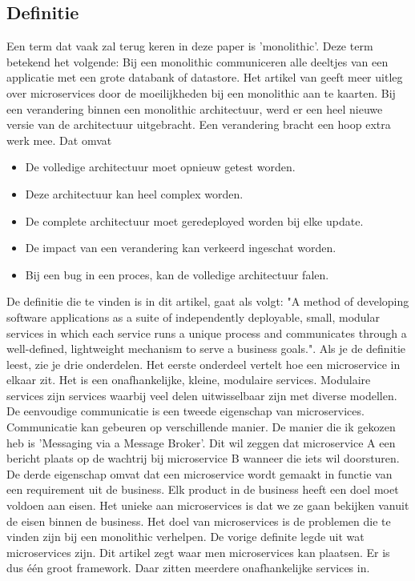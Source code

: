 \subsection{Definitie}
Een term dat vaak zal terug keren in deze paper is 'monolithic'. Deze term betekend het volgende: Bij een monolithic communiceren alle deeltjes van een applicatie met een grote databank of datastore.
Het artikel van \textcite{Mauersberger2017} geeft meer uitleg over microservices door de moeilijkheden bij een monolithic aan te kaarten. Bij een verandering binnen een monolithic architectuur, werd er een heel nieuwe versie van de architectuur uitgebracht. Een verandering bracht een hoop extra werk mee. Dat omvat 
\begin{itemize}
	\item De volledige architectuur moet opnieuw getest worden.
	\item Deze architectuur kan heel complex worden.
	\item De complete architectuur moet geredeployed worden bij elke update.
	\item De impact van een verandering kan verkeerd ingeschat worden.
	\item Bij een bug in een proces, kan de volledige architectuur falen.
\end{itemize}
De definitie die te vinden is in dit artikel, gaat als volgt: "A method of developing software applications as a suite of independently deployable, small, modular services in which each service runs a unique process and communicates through a well-defined, lightweight mechanism to serve a business goals.". Als je de definitie leest, zie je drie onderdelen. Het eerste onderdeel vertelt hoe een microservice in elkaar zit. Het is een onafhankelijke, kleine, modulaire services. Modulaire services zijn services waarbij veel delen uitwisselbaar zijn met diverse modellen. De eenvoudige communicatie is een tweede eigenschap van microservices. Communicatie kan gebeuren op verschillende manier. De manier die ik gekozen heb is 'Messaging via a Message Broker'. Dit wil zeggen dat microservice A een bericht plaats op de wachtrij bij microservice B wanneer die iets wil doorsturen.  De derde eigenschap omvat dat een microservice wordt gemaakt in functie van een requirement uit de business. Elk product in de business heeft een doel moet voldoen aan eisen. Het unieke aan microservices is dat we ze gaan bekijken vanuit de eisen binnen de business. Het doel van microservices is de problemen die te vinden zijn bij een monolithic verhelpen. De vorige definite legde uit wat microservices zijn. Dit artikel zegt waar men microservices kan plaatsen. Er is dus één groot framework. Daar zitten meerdere onafhankelijke services in.

